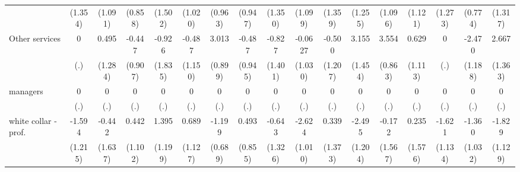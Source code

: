 {\begin{tabular}{l*{16}{c}}
                    &     (1.354)         &     (1.091)         &     (0.858)         &     (1.502)         &     (1.020)         &     (0.963)         &     (0.947)         &     (1.350)         &     (1.099)         &     (1.359)         &     (1.255)         &     (1.096)         &     (1.121)         &     (1.273)         &     (0.774)         &     (1.317)         \\
[1em]
Other services      &           0         &       0.495         &      -0.447         &      -0.926         &      -0.487         &       3.013\sym{***}&      -0.487         &      -0.827         &     -0.0627         &      -0.500         &       3.155\sym{*}  &       3.554\sym{***}&       0.629         &           0         &      -2.470\sym{*}  &       2.667         \\
                    &         (.)         &     (1.284)         &     (0.907)         &     (1.835)         &     (1.150)         &     (0.899)         &     (0.945)         &     (1.401)         &     (1.030)         &     (1.207)         &     (1.454)         &     (0.863)         &     (1.113)         &         (.)         &     (1.188)         &     (1.363)         \\
[1em]
managers            &           0         &           0         &           0         &           0         &           0         &           0         &           0         &           0         &           0         &           0         &           0         &           0         &           0         &           0         &           0         &           0         \\
                    &         (.)         &         (.)         &         (.)         &         (.)         &         (.)         &         (.)         &         (.)         &         (.)         &         (.)         &         (.)         &         (.)         &         (.)         &         (.)         &         (.)         &         (.)         &         (.)         \\
[1em]
white collar - prof.&      -1.594         &      -0.442         &       0.442         &       1.395         &       0.689         &      -1.199         &       0.493         &      -0.643         &      -2.624\sym{**} &       0.339         &      -2.495\sym{*}  &      -0.172         &       0.235         &      -1.621         &      -1.360         &      -1.829         \\
                    &     (1.215)         &     (1.637)         &     (1.102)         &     (1.199)         &     (1.127)         &     (0.689)         &     (0.855)         &     (1.326)         &     (1.010)         &     (1.373)         &     (1.204)         &     (1.567)         &     (1.576)         &     (1.134)         &     (1.032)         &     (1.129)         \\

\end{tabular}}
